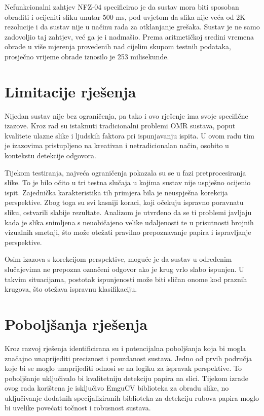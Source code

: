 \documentclass{foi}
\begin{document}
Nefunkcionalni zahtjev NFZ-04 specificirao je da sustav mora biti sposoban obraditi i ocijeniti sliku unutar 500 ms, pod uvjetom da slika nije veća od 2K rezolucije i da sustav nije u načinu rada za otklanjanje grešaka. Sustav je ne samo zadovoljio taj zahtjev, već ga je i nadmašio. Prema aritmetičkoj sredini vremena obrade u više mjerenja provedenih nad cijelim skupom testnih podataka, prosječno vrijeme obrade iznosilo je 253 milisekunde.

\section{Limitacije rješenja}
Nijedan sustav nije bez ograničenja, pa tako i ovo rješenje ima svoje specifične izazove. Kroz rad su istaknuti tradicionalni problemi OMR sustava, poput kvalitete ulazne slike i ljudskih faktora pri ispunjavanju ispita. U ovom radu tim je izazovima pristupljeno na kreativan i netradicionalan način, osobito u kontekstu detekcije odgovora.

Tijekom testiranja, najveća ograničenja pokazala su se u fazi pretprocesiranja slike. To je bilo očito u tri testna slučaja u kojima sustav nije uspješno ocijenio ispit. Zajednička karakteristika tih primjera bila je neuspješna korekcija perspektive. Zbog toga su svi kasniji koraci, koji očekuju ispravno poravnatu sliku, ostvarili slabije rezultate. Analizom je utvrđeno da se ti problemi javljaju kada je slika snimljena s neuobičajeno velike udaljenosti te u prisutnosti brojnih vizualnih smetnji, što može otežati pravilno prepoznavanje papira i ispravljanje perspektive.

Osim izazova s korekcijom perspektive, moguće je da sustav u određenim slučajevima ne prepozna označeni odgovor ako je krug vrlo slabo ispunjen. U takvim situacijama, postotak ispunjenosti može biti sličan onome kod praznih krugova, što otežava ispravnu klasifikaciju.

\section{Poboljšanja rješenja}

Kroz razvoj rješenja identificirana su i potencijalna poboljšanja koja bi mogla značajno unaprijediti preciznost i pouzdanost sustava. Jedno od prvih područja koje bi se moglo unaprijediti odnosi se na logiku za ispravak perspektive. To poboljšanje uključivalo bi kvalitetniju detekciju papira na slici. Tijekom izrade ovog rada korištena je isključivo EmguCV biblioteka za obradu slike, no uključivanje dodatnih specijaliziranih biblioteka za detekciju rubova papira moglo bi uvelike povećati točnost i robusnost sustava.
\end{document}
